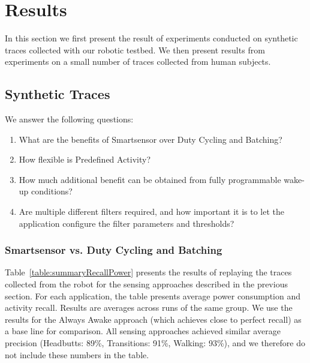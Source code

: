 


\section{Results}
\label{sec:results}

In this section we first present the result of experiments conducted
on synthetic traces collected with our robotic testbed.  We then
present results from experiments on a small number of traces collected
from human subjects. 


\subsection{Synthetic Traces}

We answer the following questions:

\begin{enumerate}
\setlength{\itemsep}{-3pt}  

\item What are the benefits of Smartsensor over Duty Cycling and
  Batching?

\item How flexible is Predefined Activity?

\item How much additional benefit can be obtained from fully
  programmable wake-up conditions?

\item Are multiple different filters required, and how important it is
  to let the application configure the filter parameters and
  thresholds?

\end{enumerate}

\subsubsection{Smartsensor vs. Duty Cycling and Batching}

Table~\ref{table:summaryRecallPower} presents the results of replaying
the traces collected from the robot for the sensing approaches
described in the previous section.  For each application, the table
presents average power consumption and activity recall.  Results are
averages across runs of the same group.  We use the results for the
Always Awake approach (which achieves close to perfect recall) as a
base line for comparison.  All sensing approaches achieved similar
average precision (Headbutts: 89\%, Transitions: 91\%, Walking:
93\%), and we therefore do not include these numbers in the table.

